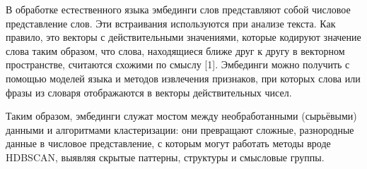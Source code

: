 В обработке естественного языка эмбединги слов представляют собой числовое представление слов. Эти встраивания используются при анализе текста. Как правило, это векторы с действительными значениями, которые кодируют значение слова таким образом, что слова, находящиеся ближе друг к другу в векторном пространстве, считаются схожими по смыслу [1]. Эмбединги можно получить с помощью моделей языка и методов извлечения признаков, при которых слова или фразы из словаря отображаются в векторы действительных чисел.

Таким образом, эмбединги служат мостом между необработанными (сырьёвыми) данными и алгоритмами кластеризации: они превращают сложные, разнородные данные в числовое представление, с которым могут работать методы вроде HDBSCAN, выявляя скрытые паттерны, структуры и смысловые группы.



